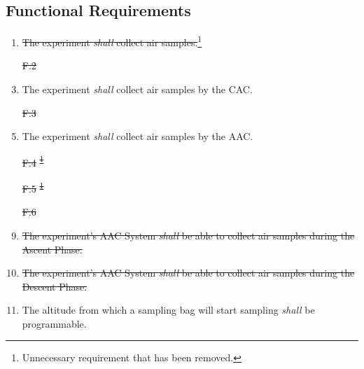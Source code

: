 \documentclass[a4paper,12pt,twoside]{article}
\providecommand{\DIFaddtex}[1]{{\protect\color{blue}\uwave{#1}}} %
\providecommand{\DIFdeltex}[1]{{\protect\color{red}\sout{#1}}}                      %
\providecommand{\DIFaddbegin}{} %
\providecommand{\DIFaddend}{} %
\providecommand{\DIFdelbegin}{} %
\providecommand{\DIFdelend}{} %
\providecommand{\DIFadd}[1]{\texorpdfstring{\DIFaddtex{#1}}{#1}} %
\providecommand{\DIFdel}[1]{\texorpdfstring{\DIFdeltex{#1}}{}} %
\newcommand{\DIFscaledelfig}{0.5}
\newlength{\DIFdelgraphicswidth} %
\newlength{\DIFdelgraphicsheight} %
\newcommand{\DIFaddincludegraphics}[2][]{{\color{blue}\fbox{\DIFOincludegraphics[#1]{#2}}}} %
\newcommand{\DIFdelincludegraphics}[2][]{%
\sbox{\DIFdelgraphicsbox}{\DIFOincludegraphics[#1]{#2}}%
\settoboxwidth{\DIFdelgraphicswidth}{\DIFdelgraphicsbox} %
\settoboxtotalheight{\DIFdelgraphicsheight}{\DIFdelgraphicsbox} %
\scalebox{\DIFscaledelfig}{%
\parbox[b]{\DIFdelgraphicswidth}{\usebox{\DIFdelgraphicsbox}\\[-\baselineskip] \rule{\DIFdelgraphicswidth}{0em}}\llap{\resizebox{\DIFdelgraphicswidth}{\DIFdelgraphicsheight}{%
\setlength{\unitlength}{\DIFdelgraphicswidth}%
\begin{picture}(1,1)%
\thicklines\linethickness{2pt} %
{\color[rgb]{1,0,0}\put(0,0){\framebox(1,1){}}}%
{\color[rgb]{1,0,0}\put(0,0){\line( 1,1){1}}}%
{\color[rgb]{1,0,0}\put(0,1){\line(1,-1){1}}}%
\end{picture}%
}\hspace*{3pt}}} %
} %
\DeclareRobustCommand{\DIFaddbegin}{\DIFOaddbegin \let\includegraphics\DIFaddincludegraphics} %
\DeclareRobustCommand{\DIFaddend}{\DIFOaddend \let\includegraphics\DIFOincludegraphics} %
\DeclareRobustCommand{\DIFdelbegin}{\DIFOdelbegin \let\includegraphics\DIFdelincludegraphics} %
\DeclareRobustCommand{\DIFdelend}{\DIFOaddend \let\includegraphics\DIFOincludegraphics} %
\begin{document}
\DIFdelend \subsection{Functional Requirements}

\DIFdelbegin %
\DIFdelend \DIFaddbegin \begin{enumerate}[label=F.\arabic*]
    \item \DIFaddend \st{The experiment \textit{shall} collect air samples.}\footnote{Unnecessary requirement that has been removed.\label{fn:unnecessary-requirement}}
    \DIFdelbegin %
\item[\DIFdel{F.2}]%
\DIFdelend \DIFaddbegin \item \DIFaddend The experiment \textit{shall} collect air samples by the CAC.
    \DIFdelbegin %
\item[\DIFdel{F.3}]%
\DIFdelend \DIFaddbegin \item \DIFaddend The experiment \textit{shall} collect air samples by the AAC.
    \DIFdelbegin %
\item[\DIFdel{F.4}]%
\DIFdel{\textsuperscript{\ref{fn:unnecessary-requirement}}
    }%
\item[\DIFdel{F.5}]%
\DIFdel{\textsuperscript{\ref{fn:unnecessary-requirement}}
    }%
\item[\DIFdel{F.6}]%
\DIFdelend \DIFaddbegin \item \st{The experiment's AAC System \textit{shall} be able to collect air samples during the Ascent Phase.}\DIFadd{\textsuperscript{\ref{fn:unnecessary-requirement}}
    }\item \st{The experiment's AAC System \textit{shall} be able to collect air samples during the Descent Phase.}\DIFadd{\textsuperscript{\ref{fn:unnecessary-requirement}}
    }\item \DIFaddend The altitude from which a sampling bag will start sampling \textit{shall} be programmable.

\end{enumerate}
\end{document}
